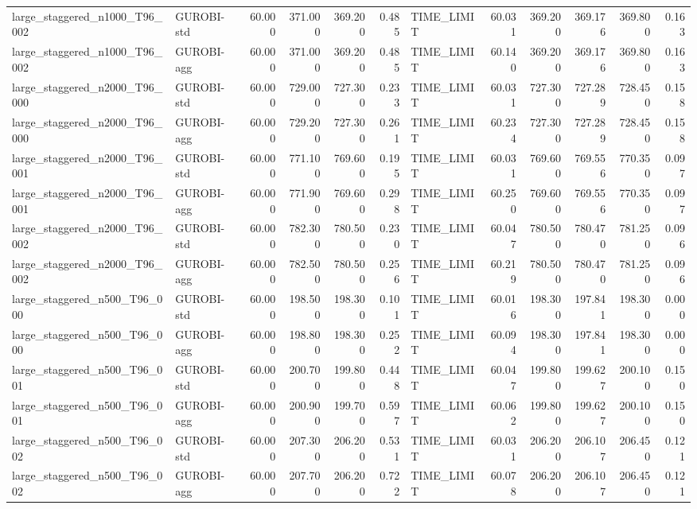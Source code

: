 \begin{table}[htbp]
\begin{tabular}{llrrrrlrrrrr}
large\_staggered\_n1000\_T96\_002 & GUROBI-std & 60.000 & 371.000 & 369.200 & 0.485 & TIME\_LIMIT & 60.031 & 369.200 & 369.176 & 369.800 & 0.163 \\
large\_staggered\_n1000\_T96\_002 & GUROBI-agg & 60.000 & 371.000 & 369.200 & 0.485 & TIME\_LIMIT & 60.140 & 369.200 & 369.176 & 369.800 & 0.163 \\
large\_staggered\_n2000\_T96\_000 & GUROBI-std & 60.000 & 729.000 & 727.300 & 0.233 & TIME\_LIMIT & 60.031 & 727.300 & 727.289 & 728.450 & 0.158 \\
large\_staggered\_n2000\_T96\_000 & GUROBI-agg & 60.000 & 729.200 & 727.300 & 0.261 & TIME\_LIMIT & 60.234 & 727.300 & 727.289 & 728.450 & 0.158 \\
large\_staggered\_n2000\_T96\_001 & GUROBI-std & 60.000 & 771.100 & 769.600 & 0.195 & TIME\_LIMIT & 60.031 & 769.600 & 769.556 & 770.350 & 0.097 \\
large\_staggered\_n2000\_T96\_001 & GUROBI-agg & 60.000 & 771.900 & 769.600 & 0.298 & TIME\_LIMIT & 60.250 & 769.600 & 769.556 & 770.350 & 0.097 \\
large\_staggered\_n2000\_T96\_002 & GUROBI-std & 60.000 & 782.300 & 780.500 & 0.230 & TIME\_LIMIT & 60.047 & 780.500 & 780.470 & 781.250 & 0.096 \\
large\_staggered\_n2000\_T96\_002 & GUROBI-agg & 60.000 & 782.500 & 780.500 & 0.256 & TIME\_LIMIT & 60.219 & 780.500 & 780.470 & 781.250 & 0.096 \\
large\_staggered\_n500\_T96\_000 & GUROBI-std & 60.000 & 198.500 & 198.300 & 0.101 & TIME\_LIMIT & 60.016 & 198.300 & 197.841 & 198.300 & 0.000 \\
large\_staggered\_n500\_T96\_000 & GUROBI-agg & 60.000 & 198.800 & 198.300 & 0.252 & TIME\_LIMIT & 60.094 & 198.300 & 197.841 & 198.300 & 0.000 \\
large\_staggered\_n500\_T96\_001 & GUROBI-std & 60.000 & 200.700 & 199.800 & 0.448 & TIME\_LIMIT & 60.047 & 199.800 & 199.627 & 200.100 & 0.150 \\
large\_staggered\_n500\_T96\_001 & GUROBI-agg & 60.000 & 200.900 & 199.700 & 0.597 & TIME\_LIMIT & 60.062 & 199.800 & 199.627 & 200.100 & 0.150 \\
large\_staggered\_n500\_T96\_002 & GUROBI-std & 60.000 & 207.300 & 206.200 & 0.531 & TIME\_LIMIT & 60.031 & 206.200 & 206.107 & 206.450 & 0.121 \\
large\_staggered\_n500\_T96\_002 & GUROBI-agg & 60.000 & 207.700 & 206.200 & 0.722 & TIME\_LIMIT & 60.078 & 206.200 & 206.107 & 206.450 & 0.121 \\

\end{tabular}
\end{table}
